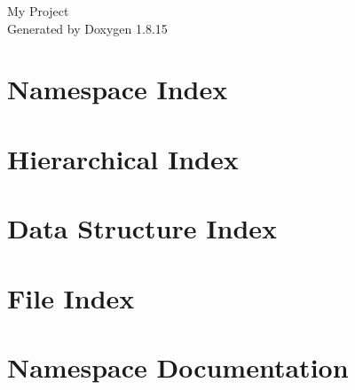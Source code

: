 \let\mypdfximage\pdfximage\def\pdfximage{\immediate\mypdfximage}\documentclass[twoside]{book}
\newcommand{\+}{\discretionary{\mbox{\scriptsize$\hookleftarrow$}}{}{}}
\newcommand{\clearemptydoublepage}{%
  \newpage{\pagestyle{empty}\cleardoublepage}%
}
\begin{document}
\hypersetup{pageanchor=false,
             bookmarksnumbered=true,
             pdfencoding=unicode
            }
\begin{titlepage}
\vspace*{7cm}
\begin{center}%
{\Large My Project }\\
\vspace*{1cm}
{\large Generated by Doxygen 1.8.15}\\
\end{center}
\end{titlepage}
\clearemptydoublepage
{}
\tableofcontents
\clearemptydoublepage
{}
\hypersetup{pageanchor=true}

\chapter{Namespace Index}

\chapter{Hierarchical Index}

\chapter{Data Structure Index}

\chapter{File Index}

\chapter{Namespace Documentation}









\end{document}
